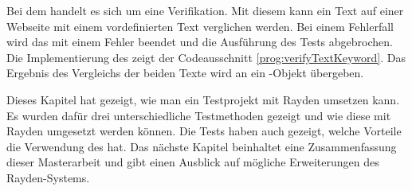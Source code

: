 \SuperPar
Bei dem   handelt es sich um eine Verifikation. Mit diesem  kann ein Text auf einer Webseite mit einem vordefinierten Text verglichen werden. Bei einem Fehlerfall wird das  mit einem Fehler beendet und die Ausführung des Tests abgebrochen. Die Implementierung des  zeigt der Codeausschnitt \ref{prog:verifyTextKeyword}. Das Ergebnis des Vergleichs der beiden Texte wird an ein -Objekt übergeben. 


%

\SuperPar
Dieses Kapitel hat gezeigt, wie man ein Testprojekt mit Rayden umsetzen kann. Es wurden dafür drei unterschiedliche Testmethoden gezeigt und wie diese mit Rayden umgesetzt werden können. Die Tests haben auch gezeigt, welche Vorteile die Verwendung des  hat. Das nächste Kapitel beinhaltet eine Zusammenfassung dieser Masterarbeit und gibt einen Ausblick auf mögliche Erweiterungen des Rayden-Systems. 